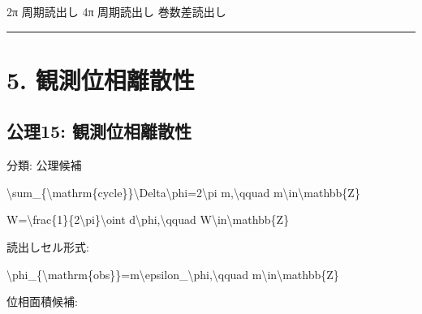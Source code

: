 \documentclass[
  a4paper,
]{ltjsarticle}
\newenvironment{Shaded}{}{}
\newcommand{\NormalTok}[1]{#1}
\begin{document}
\begin{Shaded}
\begin{Highlighting}[]
\NormalTok{2π 周期読出し}
\NormalTok{4π 周期読出し}
\NormalTok{巻数差読出し}
\end{Highlighting}
\end{Shaded}

\begin{center}\rule{0.5\linewidth}{0.5pt}\end{center}

\section{5.
観測位相離散性}\label{ux89b3ux6e2cux4f4dux76f8ux96e2ux6563ux6027}

\subsection{公理15:
観測位相離散性}\label{ux516cux740615-ux89b3ux6e2cux4f4dux76f8ux96e2ux6563ux6027}

分類: 公理候補

\begin{Shaded}
\begin{Highlighting}[]
\NormalTok{\textbackslash{}sum\_\{\textbackslash{}mathrm\{cycle\}\}\textbackslash{}Delta\textbackslash{}phi=2\textbackslash{}pi m,\textbackslash{}qquad m\textbackslash{}in\textbackslash{}mathbb\{Z\}}
\end{Highlighting}
\end{Shaded}

\begin{Shaded}
\begin{Highlighting}[]
\NormalTok{W=\textbackslash{}frac\{1\}\{2\textbackslash{}pi\}\textbackslash{}oint d\textbackslash{}phi,\textbackslash{}qquad W\textbackslash{}in\textbackslash{}mathbb\{Z\}}
\end{Highlighting}
\end{Shaded}

読出しセル形式:

\begin{Shaded}
\begin{Highlighting}[]
\NormalTok{\textbackslash{}phi\_\{\textbackslash{}mathrm\{obs\}\}=m\textbackslash{}epsilon\_\textbackslash{}phi,\textbackslash{}qquad m\textbackslash{}in\textbackslash{}mathbb\{Z\}}
\end{Highlighting}
\end{Shaded}

位相面積候補:
\end{document}

